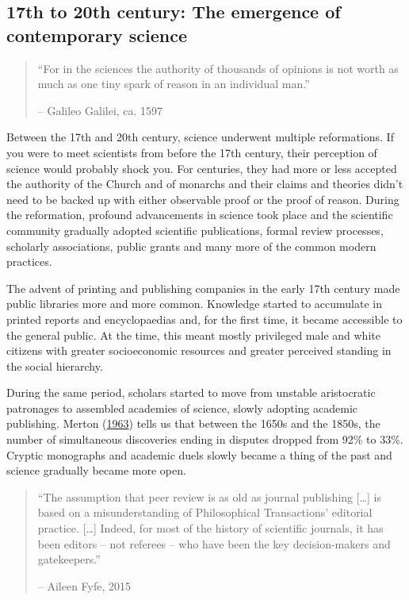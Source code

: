 \documentclass[
]{book}
\begin{document}
\hypertarget{th-to-20th-century-the-emergence-of-contemporary-science}{%
\subsection{17th to 20th century: The emergence of contemporary science}\label{th-to-20th-century-the-emergence-of-contemporary-science}}

\begin{quote}
``For in the sciences the authority of thousands of opinions is not worth as much as one tiny spark of reason in an individual man.''

-- Galileo Galilei, ca. 1597
\end{quote}

Between the 17th and 20th century, science underwent multiple reformations. If you were to meet scientists from before the 17th century, their perception of science would probably shock you. For centuries, they had more or less accepted the authority of the Church and of monarchs and their claims and theories didn't need to be backed up with either observable proof or the proof of reason. During the reformation, profound advancements in science took place and the scientific community gradually adopted scientific publications, formal review processes, scholarly associations, public grants and many more of the common modern practices.

The advent of printing and publishing companies in the early 17th century made public libraries more and more common. Knowledge started to accumulate in printed reports and encyclopaedias and, for the first time, it became accessible to the general public. At the time, this meant mostly privileged male and white citizens with greater socioeconomic resources and greater perceived standing in the social hierarchy.

During the same period, scholars started to move from unstable aristocratic patronages to assembled academies of science, slowly adopting academic publishing. Merton (\href{https://www.cambridge.org/core/journals/european-journal-of-sociology-archives-europeennes-de-sociologie/article/abs/resistance-to-the-systematic-study-of-multiple-discoveries-in-science/8FEC108B3D8B0DAD60416B36BE342959}{1963}) tells us that between the 1650s and the 1850s, the number of simultaneous discoveries ending in disputes dropped from 92\% to 33\%. Cryptic monographs and academic duels slowly became a thing of the past and science gradually became more open.

\begin{quote}
``The assumption that peer review is as old as journal publishing {[}\ldots{]} is based on a misunderstanding of Philosophical Transactions' editorial practice. {[}\ldots{]} Indeed, for most of the history of scientific journals, it has been editors -- not referees -- who have been the key decision-makers and gatekeepers.''

-- Aileen Fyfe, 2015
\end{quote}
\end{document}
